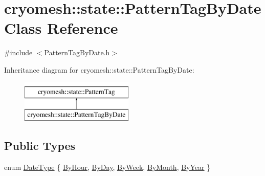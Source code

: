 \hypertarget{classcryomesh_1_1state_1_1PatternTagByDate}{\section{cryomesh\-:\-:state\-:\-:\-Pattern\-Tag\-By\-Date \-Class \-Reference}
\label{classcryomesh_1_1state_1_1PatternTagByDate}
}


{\ttfamily \#include $<$\-Pattern\-Tag\-By\-Date.\-h$>$}

\-Inheritance diagram for cryomesh\-:\-:state\-:\-:\-Pattern\-Tag\-By\-Date\-:\begin{figure}[H]
\begin{center}
\leavevmode
\includegraphics[height=2.000000cm]{classcryomesh_1_1state_1_1PatternTagByDate}
\end{center}
\end{figure}
\subsection*{\-Public \-Types}
\begin{DoxyCompactItemize}
\item 
enum \hyperlink{classcryomesh_1_1state_1_1PatternTagByDate_a0fe44df3214c9397e04ff9a4e8c57ad9}{\-Date\-Type} \{ \*
\hyperlink{classcryomesh_1_1state_1_1PatternTagByDate_a0fe44df3214c9397e04ff9a4e8c57ad9ad826bb03f7153f932902328c419b8f80}{\-By\-Hour}, 
\hyperlink{classcryomesh_1_1state_1_1PatternTagByDate_a0fe44df3214c9397e04ff9a4e8c57ad9aec5bb160aa0c7a042b45a87f0d3f8979}{\-By\-Day}, 
\hyperlink{classcryomesh_1_1state_1_1PatternTagByDate_a0fe44df3214c9397e04ff9a4e8c57ad9a0bd9fc8aa9c2f402cf350ed1043ebbbe}{\-By\-Week}, 
\hyperlink{classcryomesh_1_1state_1_1PatternTagByDate_a0fe44df3214c9397e04ff9a4e8c57ad9ab50088f4741522f6f750fb2b9727e6de}{\-By\-Month}, 
\*
\hyperlink{classcryomesh_1_1state_1_1PatternTagByDate_a0fe44df3214c9397e04ff9a4e8c57ad9a3516aaaf680fa1aaf3eabf97f32fe1a9}{\-By\-Year}
 \}
\end{DoxyCompactItemize}
